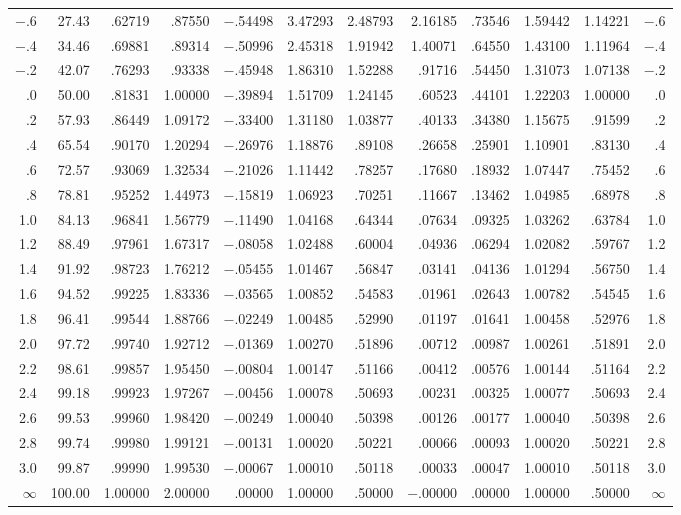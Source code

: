 \begin{sidewaystable}
\begin{tabular}{*{12}{r}}
 $-$.6&27.43&.62719&.87550&$-$.54498&3.47293&2.48793&2.16185&.73546&1.59442&1.14221&$-$.6\\
 $-$.4&34.46&.69881&.89314&$-$.50996&2.45318&1.91942&1.40071&.64550&1.43100&1.11964&$-$.4\\
 $-$.2&42.07&.76293&.93338&$-$.45948&1.86310&1.52288&.91716&.54450&1.31073&1.07138&$-$.2\\
[1.1ex]
 .0&50.00&.81831&1.00000&$-$.39894&1.51709&1.24145&.60523&.44101&1.22203&1.00000&.0\\
 .2&57.93&.86449&1.09172&$-$.33400&1.31180&1.03877&.40133&.34380&1.15675&.91599&.2\\
 .4&65.54&.90170&1.20294&$-$.26976&1.18876&.89108&.26658&.25901&1.10901&.83130&.4\\
 .6&72.57&.93069&1.32534&$-$.21026&1.11442&.78257&.17680&.18932&1.07447&.75452&.6\\
 .8&78.81&.95252&1.44973&$-$.15819&1.06923&.70251&.11667&.13462&1.04985&.68978&.8\\
[1.1ex]
 1.0&84.13&.96841&1.56779&$-$.11490&1.04168&.64344&.07634&.09325&1.03262&.63784&1.0\\
 1.2&88.49&.97961&1.67317&$-$.08058&1.02488&.60004&.04936&.06294&1.02082&.59767&1.2\\
 1.4&91.92&.98723&1.76212&$-$.05455&1.01467&.56847&.03141&.04136&1.01294&.56750&1.4\\
 1.6&94.52&.99225&1.83336&$-$.03565&1.00852&.54583&.01961&.02643&1.00782&.54545&1.6\\
 1.8&96.41&.99544&1.88766&$-$.02249&1.00485&.52990&.01197&.01641&1.00458&.52976&1.8\\
[1.1ex]
 2.0&97.72&.99740&1.92712&$-$.01369&1.00270&.51896&.00712&.00987&1.00261&.51891&2.0\\
 2.2&98.61&.99857&1.95450&$-$.00804&1.00147&.51166&.00412&.00576&1.00144&.51164&2.2\\
 2.4&99.18&.99923&1.97267&$-$.00456&1.00078&.50693&.00231&.00325&1.00077&.50693&2.4\\
 2.6&99.53&.99960&1.98420&$-$.00249&1.00040&.50398&.00126&.00177&1.00040&.50398&2.6\\
 2.8&99.74&.99980&1.99121&$-$.00131&1.00020&.50221&.00066&.00093&1.00020&.50221&2.8\\
[1.1ex]
 3.0&99.87&.99990&1.99530&$-$.00067&1.00010&.50118&.00033&.00047&1.00010&.50118&3.0\\
 $\infty$&100.00&1.00000&2.00000&.00000&1.00000&.50000&$-$.00000&.00000&1.00000&.50000&$\infty$\\
\hline
\end{tabular}
\begin{minipage}[t]{7in}

\end{minipage}
\label{atable:lognormal.plan}
\end{sidewaystable}
